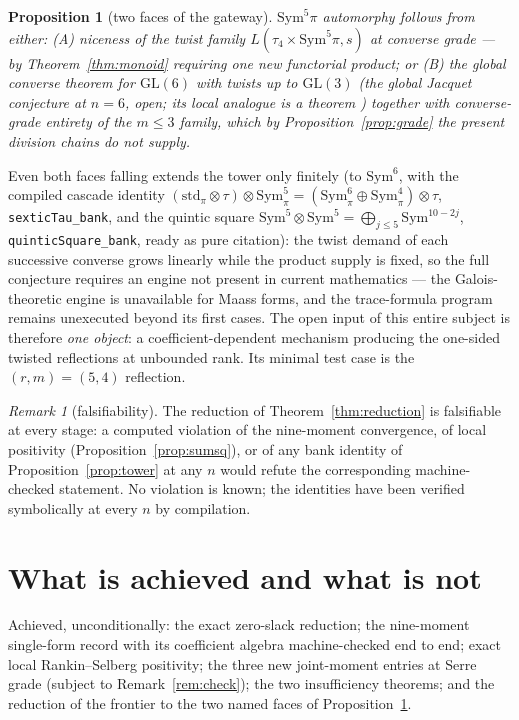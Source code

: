 \documentclass[11pt]{article}
\newtheorem{proposition}[theorem]{Proposition}
\theoremstyle{definition}
\theoremstyle{remark}
\newtheorem{remark}[theorem]{Remark}
\newcommand{\Sym}{\mathrm{Sym}}
\newcommand{\GL}{\mathrm{GL}}
\begin{document}
\begin{proposition}[two faces of the gateway]\label{prop:faces}
$\Sym^5\pi$ automorphy follows from either:
\emph{(A)} niceness of the twist family $L(\tau_4\times\Sym^5\pi,s)$ at
converse grade --- by Theorem~\ref{thm:monoid} requiring one new functorial
product; or
\emph{(B)} the global converse theorem for $\GL(6)$ with twists up to
$\GL(3)$ (the global Jacquet conjecture at $n=6$, open; its local analogue is
a theorem \cite{Chai,JacquetLiu}) \emph{together with} converse-grade
entirety of the $m\le3$ family, which by Proposition~\ref{prop:grade} the
present division chains do not supply.
\end{proposition}

Even both faces falling extends the tower only finitely (to $\Sym^6$, with
the compiled cascade identity
$(\mathrm{std}_\pi\otimes\tau)\otimes\Sym^5_\pi=(\Sym^6_\pi\oplus\Sym^4_\pi)
\otimes\tau$, \texttt{sexticTau\_bank}, and the quintic square
$\Sym^5\otimes\Sym^5=\bigoplus_{j\le5}\Sym^{10-2j}$,
\texttt{quinticSquare\_bank}, ready as pure citation): the twist demand of
each successive converse grows linearly while the product supply is fixed, so
the full conjecture requires an engine not present in current mathematics ---
the Galois-theoretic engine is unavailable for Maass forms, and the
trace-formula program remains unexecuted beyond its first cases.  The open
input of this entire subject is therefore \emph{one object}: a
coefficient-dependent mechanism producing the one-sided twisted reflections
at unbounded rank.  Its minimal test case is the $(r,m)=(5,4)$ reflection.

\begin{remark}[falsifiability]\label{rem:falsify}
The reduction of Theorem~\ref{thm:reduction} is falsifiable at every stage:
a computed violation of the nine-moment convergence, of local positivity
(Proposition~\ref{prop:sumsq}), or of any bank identity of
Proposition~\ref{prop:tower} at any $n$ would refute the corresponding
machine-checked statement.  No violation is known; the identities have been
verified symbolically at every $n$ by compilation.
\end{remark}

\section{What is achieved and what is not}\label{sec:status}

Achieved, unconditionally: the exact zero-slack reduction; the nine-moment
single-form record with its coefficient algebra machine-checked end to end;
exact local Rankin--Selberg positivity; the three new joint-moment entries at
Serre grade (subject to Remark~\ref{rem:check}); the two insufficiency
theorems; and the reduction of the frontier to the two named faces of
Proposition~\ref{prop:faces}.
\end{document}
